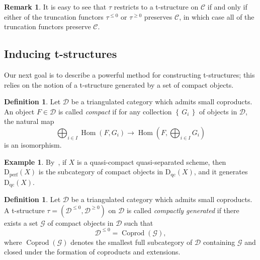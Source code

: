 \documentclass[11pt, reqno]{amsart}
\numberwithin{equation}{section}
\theoremstyle{plain}
\theoremstyle{remark}
\theoremstyle{definition}
\newtheorem{definition}[theorem]{Definition}
\newtheorem{example}[theorem]{Example}
\newtheorem{remark}[theorem]{Remark}
\theoremstyle{italicsname}
\newcommand{\set}[1]{\left\{ \, #1 \, \right\}}
\newcommand{\Dperf}{\mathrm{D}_{\mathrm{perf}}}
\newcommand{\Dqc}{\mathrm{D}_{\mathrm{qc}}}
\DeclareMathOperator{\Coprod}{Coprod}
\DeclareMathOperator{\Hom}{Hom}
\newcommand{\cG}{\mathcal{G}}
\newcommand{\cC}{\mathscr{C}}
\newcommand{\cD}{\mathscr{D}}
\begin{document}
\begin{remark}
It is easy to see that $\tau$ restricts to a t-structure on $\cC$ if and only if either of the truncation functors $\tau^{\leqslant 0}$ or $\tau^{\geqslant0}$ preserves $\cC$, in which case all of the truncation functors preserve $\cC$. 
\end{remark}

\subsection{Inducing t-structures} 

Our next goal is to describe a powerful method for constructing t-structures; this relies on the notion of a t-structure generated by a set of compact objects.

\begin{definition}
    Let $\cD$ be a triangulated category which admits small coproducts. 
    An object $F \in \cD$ is called \emph{compact} if for any collection $\set{ G_i }$ of objects in $\cD$, the natural map 
\begin{equation*}
    \bigoplus_{i \in I} \Hom(F, G_i) \to 
    \Hom \left(F, \bigoplus_{i \in I} G_i \right) 
\end{equation*}
is an isomorphism. 
\end{definition}

\begin{example}
    By~\cite{BVDB}, if $X$ is a quasi-compact quasi-separated scheme, then $\Dperf(X)$ is the subcategory of compact objects in $\Dqc(X)$, and it generates $\Dqc(X)$.
\end{example}

\begin{definition}
\label{definition-CG-t-structure}
    Let $\cD$ be a triangulated category which admits small coproducts. 
    A t-structure $\tau = (\cD^{\leqslant 0}, \cD^{\geqslant 0})$ on $\cD$ is called \emph{compactly generated} if there exists a set $\cG$ of compact objects in $\cD$ such that 
    \begin{equation*}
    \cD^{\leqslant 0} = \Coprod(\cG), 
    \end{equation*} 
    where $\Coprod(\cG)$ denotes the smallest full subcategory of $\cD$ containing $\cG$ and closed under the formation of coproducts and extensions. 
\end{definition}
\end{document}
